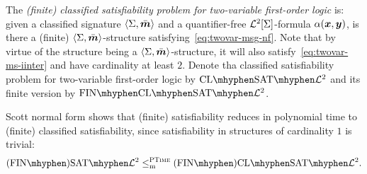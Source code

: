 \begin{definition}\label{def:clsig-twovar}
The \emph{(finite) classified satisfiability problem for two-variable
first-order logic} is:
given a classified signature $\left\langle \mathrm{\Sigma},\bar{\bm{m}} \right\rangle$ and a quantifier-free
$\mathcal{L}^{2}[\mathrm{\Sigma}]$-formula $\alpha(\bm{x},\bm{y})$, is there a (finite)
$\left\langle \mathrm{\Sigma},\bar{\bm{m}} \right\rangle$-structure satisfying~\cref{eq:twovar-msg-nf}.
Note that by virtue of the structure being a $\left\langle \mathrm{\Sigma},\bar{\bm{m}} \right\rangle$-structure, it
will also satisfy~\cref{eq:twovar-ms-iinter} and have cardinality at least $2$.
Denote tha classified satisfiability problem for two-variable first-order logic
by $\ClSat{\vFo2}$ and its finite version by $\FinClSat{\vFo2}$.
\end{definition}

Scott normal form shows that (finite) satisfiability reduces in polynomial time
to (finite) classified satisfiability, since satisfiability in structures of
cardinality $1$ is trivial:
\[
  \FinASat{\vFo2} \red\cP \FinAClSat{\vFo2}.
\]

